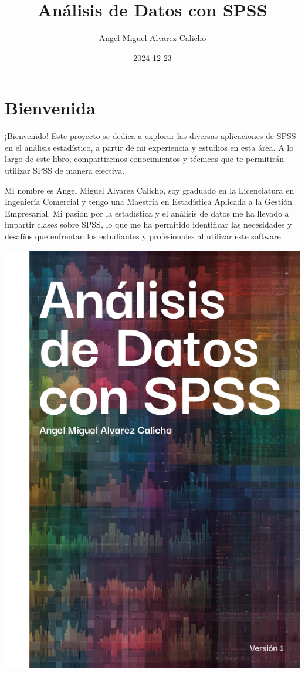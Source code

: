\documentclass[
  letterpaper,
  DIV=11,
  numbers=noendperiod]{scrreprt}
\title{Análisis de Datos con SPSS}
\author{Angel Miguel Alvarez Calicho}
\date{2024-12-23}
\renewcommand*\contentsname{Tabla de contenidos}
\newcommand\contentsname{Tabla de contenidos}
\begin{document}
\maketitle

\renewcommand*\contentsname{Tabla de contenidos}
{
\hypersetup{linkcolor=}
\setcounter{tocdepth}{2}
\tableofcontents
}


\chapter*{Bienvenida}\label{bienvenida}


¡Bienvenido! Este proyecto se dedica a explorar las diversas
aplicaciones de SPSS en el análisis estadístico, a partir de mi
experiencia y estudios en esta área. A lo largo de este libro,
compartiremos conocimientos y técnicas que te permitirán utilizar SPSS
de manera efectiva.

Mi nombre es Angel Miguel Alvarez Calicho, soy graduado en la
Licenciatura en Ingeniería Comercial y tengo una Maestría en Estadística
Aplicada a la Gestión Empresarial. Mi pasión por la estadística y el
análisis de datos me ha llevado a impartir clases sobre SPSS, lo que me
ha permitido identificar las necesidades y desafíos que enfrentan los
estudiantes y profesionales al utilizar este software.

\includegraphics[width=1\textwidth,height=\textheight]{images/Portada Libro de SPSS.webp}
\end{document}
